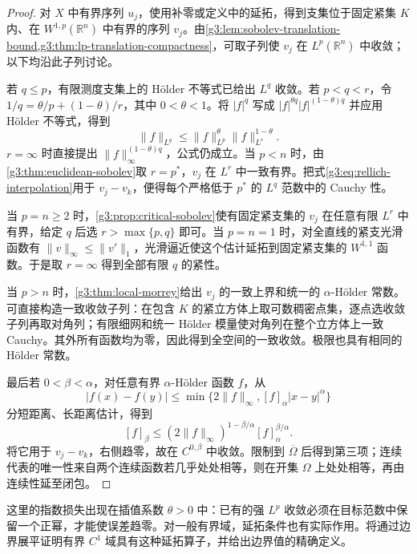\begin{proof}
	对 \(X\) 中有界序列 \(u_j\)，使用补零或定义中的延拓，得到支集位于固定紧集 \(K\) 内、在 \(W^{1,p}(\mathbb R^n)\) 中有界的序列 \(v_j\)。由\cref{g3:lem:sobolev-translation-bound,g3:thm:lp-translation-compactness}，可取子列使 \(v_j\) 在 \(L^p(\mathbb R^n)\) 中收敛；以下均沿此子列讨论。

	若 \(q\le p\)，有限测度支集上的 Hölder 不等式已给出 \(L^q\) 收敛。若 \(p<q<r\)，令 \(1/q=\theta/p+(1-\theta)/r\)，其中 \(0<\theta<1\)。将 \(|f|^q\) 写成 \(|f|^{\theta q}|f|^{(1-\theta)q}\) 并应用 Hölder 不等式，得到
	\begin{equation}\label{g3:eq:rellich-interpolation}
		\|f\|_{L^q}\le\|f\|_{L^p}^{\theta}\|f\|_{L^r}^{1-\theta}.
	\end{equation}
	\(r=\infty\) 时直接提出 \(\|f\|_\infty^{(1-\theta)q}\)，公式仍成立。当 \(p<n\) 时，由\cref{g3:thm:euclidean-sobolev}取 \(r=p^*\)，\(v_j\) 在 \(L^r\) 中一致有界。把式\eqref{g3:eq:rellich-interpolation}用于 \(v_j-v_k\)，便得每个严格低于 \(p^*\) 的 \(L^q\) 范数中的 Cauchy 性。

	当 \(p=n\ge2\) 时，\cref{g3:prop:critical-sobolev}使有固定紧支集的 \(v_j\) 在任意有限 \(L^r\) 中有界，给定 \(q\) 后选 \(r>\max\{p,q\}\) 即可。当 \(p=n=1\) 时，对全直线的紧支光滑函数有 \(\|v\|_\infty\le\|v'\|_1\)，光滑逼近使这个估计延拓到固定紧支集的 \(W^{1,1}\) 函数。于是取 \(r=\infty\) 得到全部有限 \(q\) 的紧性。

	当 \(p>n\) 时，\cref{g3:thm:local-morrey}给出 \(v_j\) 的一致上界和统一的 \(\alpha\)-Hölder 常数。可直接构造一致收敛子列：在包含 \(K\) 的紧立方体上取可数稠密点集，逐点选收敛子列再取对角列；有限细网和统一 Hölder 模量使对角列在整个立方体上一致 Cauchy。其外所有函数均为零，因此得到全空间的一致收敛。极限也具有相同的 Hölder 常数。

	最后若 \(0<\beta<\alpha\)，对任意有界 \(\alpha\)-Hölder 函数 \(f\)，从
	\[
		|f(x)-f(y)|\le\min\{2\|f\|_\infty,[f]_{\alpha}|x-y|^\alpha\}
	\]
	分短距离、长距离估计，得到
	\[
		[f]_\beta\le(2\|f\|_\infty)^{1-\beta/\alpha}[f]_\alpha^{\beta/\alpha}.
	\]
	将它用于 \(v_j-v_k\)，右侧趋零，故在 \(C^{0,\beta}\) 中收敛。限制到 \(\overline\Omega\) 后得到第三项；连续代表的唯一性来自两个连续函数若几乎处处相等，则在开集 \(\Omega\) 上处处相等，再由连续性延至闭包。
\end{proof}

这里的指数损失出现在插值系数 \(\theta>0\) 中：已有的强 \(L^p\) 收敛必须在目标范数中保留一个正幂，才能使误差趋零。对一般有界域，延拓条件也有实际作用。将通过边界展平证明有界 \(C^1\) 域具有这种延拓算子，并给出边界值的精确定义。

